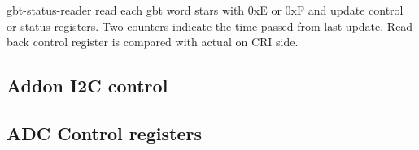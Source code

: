 \documentclass{article}
\begin{document}
gbt-status-reader read each gbt word stars with 0xE or 0xF and update control or status registers. Two counters indicate the time passed from last update. Read back control register is compared with actual on CRI side. 







\subsection{Addon I2C control}










\subsection{ADC Control registers}
\end{document}
